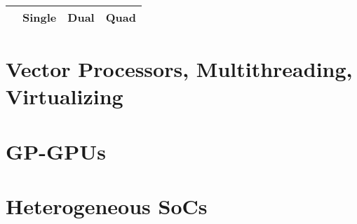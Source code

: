 \documentclass[a4paper, fontsize=8pt, landscape, DIV=1]{scrartcl}
\makeatletter
\renewenvironment{outline}[1][]{%
  \ifthenelse{\equal{#1}{}}{}{\renewcommand{\ol@type}{#1}}%
  \ol@z%
  \newcommand{\0}{\ol@toz\ol@z}%
  \newcommand{\1}{\vspace{\dimexpr\outlinespacingscalar\baselineskip-\baselineskip}\ol@toi\ol@i\item}%
  \newcommand{\2}{\vspace{\dimexpr\outlinespacingscalartwo\baselineskip-\baselineskip}\ol@toii\ol@ii\item}%
  \newcommand{\3}{\vspace{\dimexpr\outlinespacingscalar\baselineskip-\baselineskip}\ol@toiii\ol@iii\item}%
  \newcommand{\4}{\vspace{\dimexpr\outlinespacingscalar\baselineskip-\baselineskip}\ol@toiiii\ol@iiii\item}%
}{%
  \ol@toz\ol@exit%
}
\def\outlinespacingscalar{0.5}
\def\outlinespacingscalartwo{0.5}
\makeatother
\begin{document}
\begin{multicols*}{4}
  \begin{outline}
    \1 
  \end{outline}

   \begin{tabularx}{\linewidth}{l c c c}
    \hline
    {} & Single & Dual & Quad \\ \hline
  \end{tabularx}



  \section{Vector Processors, Multithreading, Virtualizing}


  \section{GP-GPUs}


  \section{Heterogeneous SoCs}



    
\end{multicols*}

\setcounter{secnumdepth}{2}
\end{document}
